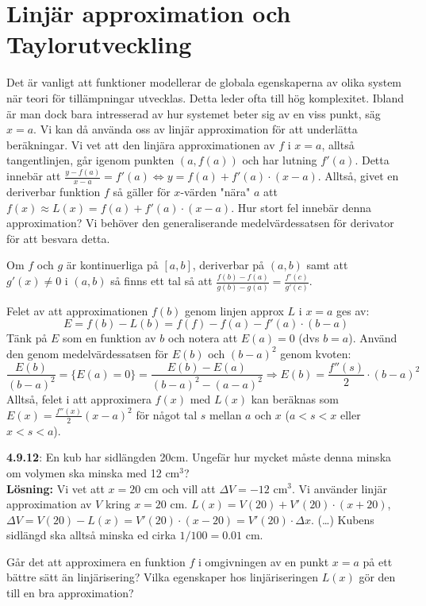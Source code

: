 \chapter{Linjär approximation och Taylorutveckling}
Det är vanligt att funktioner modellerar de globala egenskaperna av olika system när teori för tillämpningar utvecklas.
Detta leder ofta till hög komplexitet.
Ibland är man dock bara intresserad av hur systemet beter sig av en viss punkt, säg $x=a$.
Vi kan då använda oss av linjär approximation för att underlätta beräkningar.
Vi vet att den linjära approximationen av $f$ i $x=a$, alltså tangentlinjen, går igenom punkten $(a,f(a))$ och har lutning $f'(a)$.
Detta innebär att $\frac{y-f(a)}{x-a}=f'(a)\Leftrightarrow y=f(a)+f'(a)\cdot (x-a)$.
Alltså, givet en deriverbar funktion $f$ så gäller för $x$-värden "nära" $a$ att $f(x)\approx L(x)=f(a)+f'(a)\cdot (x-a)$.
Hur stort fel innebär denna approximation?
Vi behöver den generaliserande medelvärdessatsen för derivator för att besvara detta.
\begin{tpastel}
    Om $f$ och $g$ är kontinuerliga på $[a,b]$, deriverbar på $(a,b)$ samt att $g'(x)\neq 0$ i $(a,b)$ så finns ett tal så att $\frac{f(b)-f(a)}{g(b)-g(a)}=\frac{f'(c)}{g'(c)}$.
\end{tpastel}
Felet av att approximationen $f(b)$ genom linjen approx $L$ i $x=a$ ges av:
$$E=f(b)-L(b)=f(f)-f(a)-f'(a)\cdot (b-a)$$
Tänk på $E$ som en funktion av $b$ och notera att $E(a)=0$ (dvs $b=a$).
Använd den genom medelvärdessatsen för $E(b)$ och $(b-a)^2$ genom kvoten:
$$\frac{E(b)}{(b-a)^2}=\{E(a)=0\}=\frac{E(b)-E(a)}{(b-a)^2-(a-a)^2} \Rightarrow E(b)=\frac{f''(s)}{2}\cdot (b-a)^2$$
Alltså, felet i att approximera $f(x)$ med $L(x)$ kan beräknas som $E(x)=\frac{f''(x)}{2}(x-a)^2$ för något tal $s$ mellan $a$ och $x$ ($a<s<x$ eller $x<s<a$).
\begin{epastel}
    \textbf{4.9.12}: En kub har sidlängden 20cm.
    Ungefär hur mycket måste denna minska om volymen ska minska med 12 cm$^3$?\\
    \textbf{Lösning:} Vi vet att $x=20$ cm och vill att $\Delta V=-12$ cm$^3$.
    Vi använder linjär approximation av $V$ kring $x=20$ cm.
    $L(x)=V(20)+V'(20)\cdot(x+20)$, $\Delta V = V(20)-L(x)=V'(20)\cdot(x-20)=V'(20)\cdot\Delta x$. (\dots)
    Kubens sidlängd ska alltså minska ed cirka $1/100=0.01$ cm.
\end{epastel}
Går det att approximera en funktion $f$ i omgivningen av en punkt $x=a$ på ett bättre sätt än linjärisering?
Vilka egenskaper hos linjäriseringen $L(x)$ gör den till en bra approximation?
